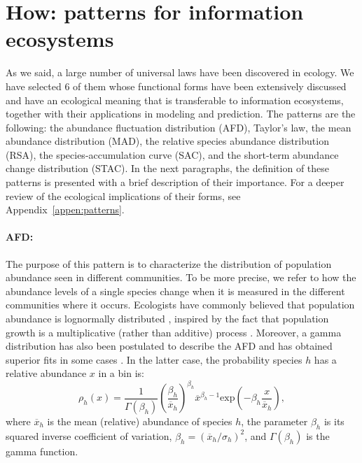 
\section{How: patterns for information ecosystems} %
As we said, a large number of universal laws have been discovered in ecology. We have selected $6$ of them whose functional forms have been extensively discussed and have an ecological meaning that is transferable to information ecosystems, together with their applications in modeling and prediction. The patterns are the following: the abundance fluctuation distribution (AFD), Taylor's law, the mean abundance distribution (MAD), the relative species abundance distribution (RSA), the species-accumulation curve (SAC), and the short-term abundance change distribution (STAC). In the next paragraphs, the definition of these patterns is presented with a brief description of their importance. For a deeper review of the ecological implications of their forms, see Appendix~\ref{appen:patterns}.\\


\paragraph{AFD:} The purpose of this pattern is to characterize the distribution of population abundance seen in different communities. To be more precise,  we refer to how the abundance levels of a single species change when it is measured in the different communities where it occurs. Ecologists have commonly  believed that population abundance is lognormally distributed \cite{May1975PatternsOS}, inspired by the fact that population growth is a multiplicative (rather than additive) process \cite{marquet2005scaling}. Moreover, a gamma distribution has also been postulated to describe the AFD and has obtained superior fits in some cases \cite{halley2002lognormality,grilli2020macroecological}. In the latter case, the probability species $h$ has a relative abundance $x$ in a bin is:
\begin{equation}
    \rho_h (x) = \frac{1}{\Gamma(\beta_h)} \left( \frac{\beta_h}{\overline{x}_h} \right)^{\beta_h}    \overline{x}^{\beta_h -1} \textrm{exp} \left( -\beta_h \frac{x}{\overline{x}_h} \right),
\end{equation}
where $\overline{x}_h$ is the mean (relative) abundance of species $h$, the parameter $\beta_h$ is its squared inverse coefficient of variation,  $\beta_h = (\overline{x}_h / \sigma_h)^2 $, and $\Gamma(\beta_h)$ is the gamma function.\\


